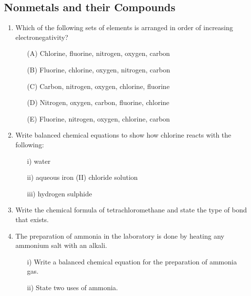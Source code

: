 \subsection{Nonmetals and their Compounds}

\begin{enumerate}
	\item Which of the following sets of elements is arranged in order of increasing electronegativity?
	\begin{enumerate}[topsep=0ex,itemsep=0ex,partopsep=1ex,parsep=1ex]
		\item[(A)] Chlorine, fluorine, nitrogen, oxygen, carbon
		\item[(B)] Fluorine, chlorine, oxygen, nitrogen, carbon
		\item[(C)] Carbon, nitrogen, oxygen, chlorine, fluorine
		\item[(D)] Nitrogen, oxygen, carbon, fluorine, chlorine
		\item[(E)] Fluorine, nitrogen, oxygen, chlorine, carbon
	\end{enumerate}
	
	\item Write balanced chemical equations to show how chlorine reacts with the following:
	\begin{enumerate}[topsep=0ex,itemsep=0ex,partopsep=1ex,parsep=1ex]
		\item[i)] water
		\item[ii)] aqueous iron (II) chloride solution
		\item[iii)] hydrogen sulphide
	\end{enumerate}
	
	\item Write the chemical formula of tetrachloromethane and state the type of bond that exists.
	
	\item The preparation of ammonia in the laboratory is done by heating any ammonium salt with an alkali.
	\begin{enumerate}[topsep=0ex,itemsep=0ex,partopsep=1ex,parsep=1ex]
		\item[i)] Write a balanced chemical equation for the preparation of ammonia gas.
		\item[ii)] State two uses of ammonia.
	\end{enumerate}
	

\end{enumerate}

